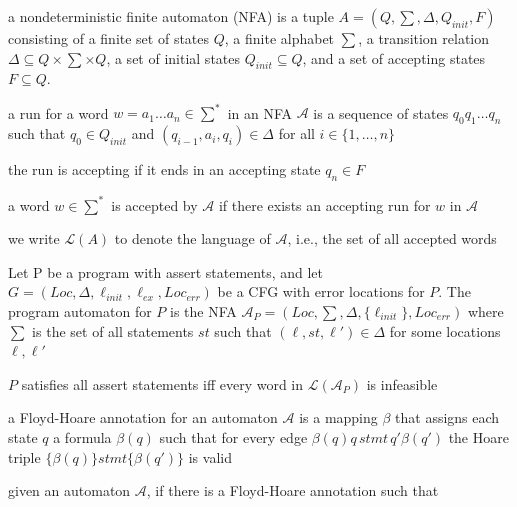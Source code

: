 \documentclass[landscape, a4paper]{article}
\begin{document}
\begin{minipage}[t]{0.2\linewidth}
	\begin{betterlist}
		\item a \alert{nondeterministic finite automaton (NFA)} is a tuple $A = (Q, \sum , \Delta , Q_{init}, F)$ consisting of a finite set of states $Q$, a finite alphabet $\sum$, a transition relation $\Delta \subseteq Q × \sum  × Q$, a set of initial states $Q_{init} \subseteq Q$, and a set of accepting states $F \subseteq Q$.
		\begin{betterlist}
			\item a \alert{run} for a word $w = a_1\ldots a_n \in \sum^{*}$ in an NFA $\mathcal{A}$ is a sequence of states $q_0q_1\ldots q_n$ such that $q_0 \in Q_{init}$ and $(q_{i−1}, a_{i}, q_{i}) \in \Delta$ for all $i \in \{1,\ldots , n\}$
			\begin{betterlist}
				\item the run is \alert{accepting} if it ends in an accepting state $q_n \in F$
			\end{betterlist}
			\item a word $w \in \sum ^*$ is \alert{accepted} by $\mathcal{A}$ if there exists an accepting run for $w$ in $\mathcal{A}$
			\item we write $\mathcal{L}(A)$ to denote the \alert{language of $\mathcal{A}$}, i.e., the set of all accepted words
		\end{betterlist}
		\item Let P be a program with assert statements, and let $G = (Loc, \Delta , \ell_{init}, \ell_{ex}, Loc_{err})$ be a CFG with error locations for $P$. \color{orange}The \alert{program automaton} for $P$ is the NFA $\mathcal{A}_P = (Loc, \sum , \Delta , \{ \ell_{init}\} , Loc_{err})$ where $\sum$ is the set of all statements $st$ such that $(\ell, st, \ell') \in \Delta$ for some locations $\ell, \ell'$\color{black}
		\begin{betterlist}
			\item $P$ satisfies all assert statements iff every word in $\mathcal{L}(\mathcal{A}_P)$ is infeasible
		\end{betterlist}
		\item \color{orange}a \alert{Floyd-Hoare annotation} for an automaton $\mathcal{A}$ is a mapping $\beta$ that assigns each state $q$ a formula $\beta(q)$ such that for every edge $\beta (q)q\, stmt\, q'\beta(q')$ the Hoare triple $\{\beta(q)\} stmt \{\beta(q′)\}$ is valid\color{black}
		\item \color{violet}given an automaton $\mathcal{A}$, if there is a Floyd-Hoare annotation such that

\end{betterlist}
\end{minipage}
\end{document}
